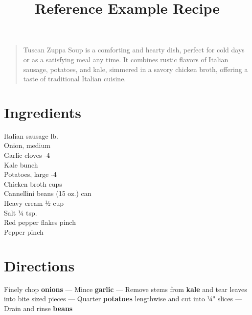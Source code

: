 \documentclass[11pt,letterpaper]{article}
\title{Reference Example Recipe}
\author{}
\date{}
\begin{document}
\maketitle
\thispagestyle{empty}

\begin{quote}
\small
\begin{em}
Tuscan Zuppa Soup is a comforting and hearty dish, perfect for cold days or as a satisfying meal any time. It combines rustic flavors of Italian sausage, potatoes, and kale, simmered in a savory chicken broth, offering a taste of traditional Italian cuisine.
\end{em}
\end{quote}

\section*{Ingredients}
\setlength{\columnsep}{20pt}
\begin{multicols}{2}
\noindent
    Italian sausage  lb. \\
    Onion, medium  \\
    Garlic cloves -4 \\
    Kale  bunch \\
    Potatoes, large -4 \\
    \columnbreak
    Chicken broth  cups \\
    Cannellini beans  (15 oz.) can \\
    Heavy cream \dotfill ½ cup \\
    Salt \dotfill ¼ tsp. \\
    Red pepper flakes \dotfill pinch \\
    Pepper \dotfill pinch \\
\end{multicols}

\section*{Directions}

\noindent
Finely chop \textbf{onions} ---
Mince \textbf{garlic} ---
Remove stems from \textbf{kale} and tear leaves into bite sized pieces ---
Quarter \textbf{potatoes} lengthwise and cut into ¼" slices ---
Drain and rinse \textbf{beans}
\end{document}
